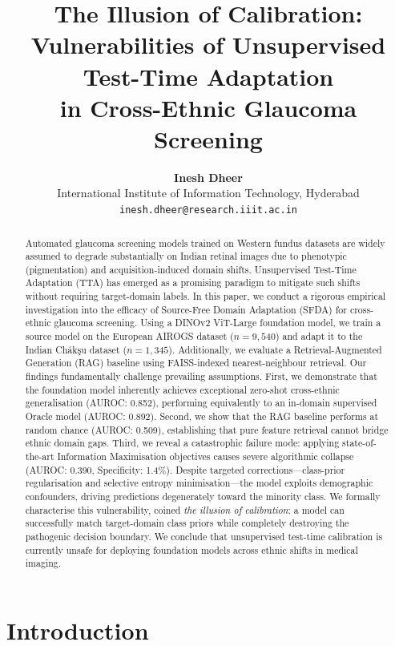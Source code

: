 \documentclass[11pt,twocolumn]{article}
\title{\textbf{The Illusion of Calibration: Vulnerabilities of Unsupervised Test-Time Adaptation\\
       in Cross-Ethnic Glaucoma Screening}}
\author{%
  \textbf{Inesh Dheer}\\[2pt]
  International Institute of Information Technology, Hyderabad\\
  \texttt{inesh.dheer@research.iiit.ac.in}
}
\date{}
\begin{document}
\maketitle

\begin{abstract}
Automated glaucoma screening models trained on Western fundus datasets are widely assumed to degrade substantially on Indian retinal images due to phenotypic (pigmentation) and acquisition-induced domain shifts. Unsupervised Test-Time Adaptation (TTA) has emerged as a promising paradigm to mitigate such shifts without requiring target-domain labels. In this paper, we conduct a rigorous empirical investigation into the efficacy of Source-Free Domain Adaptation (SFDA) for cross-ethnic glaucoma screening. Using a DINOv2 ViT-Large foundation model, we train a source model on the European AIROGS dataset ($n{=}9{,}540$) and adapt it to the Indian Ch\'{a}k\c{s}u dataset ($n{=}1{,}345$). Additionally, we evaluate a Retrieval-Augmented Generation (RAG) baseline using FAISS-indexed nearest-neighbour retrieval. Our findings fundamentally challenge prevailing assumptions. First, we demonstrate that the foundation model inherently achieves exceptional zero-shot cross-ethnic generalisation (AUROC: 0.852), performing equivalently to an in-domain supervised Oracle model (AUROC: 0.892). Second, we show that the RAG baseline performs at random chance (AUROC: 0.509), establishing that pure feature retrieval cannot bridge ethnic domain gaps. Third, we reveal a catastrophic failure mode: applying state-of-the-art Information Maximisation objectives causes severe algorithmic collapse (AUROC: 0.390, Specificity: 1.4\%). Despite targeted corrections---class-prior regularisation and selective entropy minimisation---the model exploits demographic confounders, driving predictions degenerately toward the minority class. We formally characterise this vulnerability, coined \emph{the illusion of calibration}: a model can successfully match target-domain class priors while completely destroying the pathogenic decision boundary. We conclude that unsupervised test-time calibration is currently unsafe for deploying foundation models across ethnic shifts in medical imaging.
\end{abstract}

\section{Introduction}
\label{sec:intro}
\end{document}
